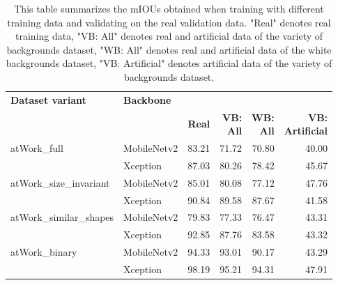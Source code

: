 	\begin{table}
		\centering
		\begin{tabular}{|l|l|r|r|r|r|}
		\hline
		\multicolumn{ 1}{|l|}{\textbf{Dataset variant}} & \multicolumn{ 1}{l|}{\textbf{Backbone}} & \multicolumn{ 4}{l|}{\makecell{\textbf{mIOU in \%}}} \\ \cline{ 3- 6}
		\multicolumn{ 1}{|l|}{} & \multicolumn{ 1}{l|}{} & \textbf{Real} & \makecell{\textbf{VB:} \\ \textbf{All}} & \makecell{\textbf{WB:} \\ \textbf{All}} & \makecell{\textbf{VB:} \\ \textbf{Artificial}} \\ \hline
		\multicolumn{ 1}{|l|}{atWork\_full} & MobileNetv2 & 83.21 & 71.72 & 70.80 & 40.00 \\ \cline{ 2- 6}
		\multicolumn{ 1}{|l|}{} & Xception & 87.03 & 80.26 & 78.42 & 45.67 \\ \hline
		\multicolumn{ 1}{|l|}{atWork\_size\_invariant} & MobileNetv2 & 85.01 & 80.08 & 77.12 & 47.76 \\ \cline{ 2- 6}
		\multicolumn{ 1}{|l|}{} & Xception & 90.84 & 89.58 & 87.67 & 41.58 \\ \hline
		\multicolumn{ 1}{|l|}{atWork\_similar\_shapes} & MobileNetv2 & 79.83 & 77.33 & 76.47 & 43.31 \\ \cline{ 2- 6}
		\multicolumn{ 1}{|l|}{} & Xception & 92.85 & 87.76 & 83.58 & 43.32 \\ \hline
		\multicolumn{ 1}{|l|}{atWork\_binary} & MobileNetv2 & 94.33 & 93.01 & 90.17 & 43.29 \\ \cline{ 2- 6}
		\multicolumn{ 1}{|l|}{} & Xception & 98.19 & 95.21 & 94.31 & 47.91 \\ \hline
		\end{tabular}
		\caption{This table summarizes the mIOUs obtained when training with different training data and validating on the real validation data. "Real" denotes real training data, "VB: All" denotes real and artificial data of the variety of backgrounds dataset, "WB: All" denotes real and artificial data of the white backgrounds dataset, "VB: Artificial" denotes artificial data of the variety of backgrounds dataset.}
		\label{Table:realval}
	\end{table}

